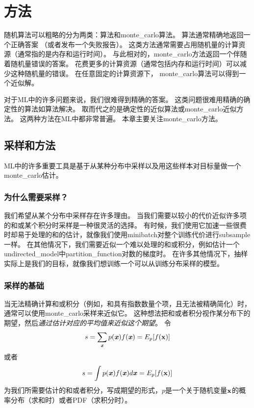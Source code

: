 \chapter{方法}
\label{chap:monte_carlo_methods}

随机算法可以粗略的分为两类：算法和\gls{monte_carlo}算法。
算法通常精确地返回一个正确答案 （或者发布一个失败报告）。
这类方法通常需要占用随机量的计算资源（通常指的是内存和运行时间）。
与此相对的，\gls{monte_carlo}方法返回一个伴随着随机量错误的答案。
花费更多的计算资源（通常包括内存和运行时间）可以减少这种随机量的错误。
在任意固定的计算资源下， \gls{monte_carlo}算法可以得到一个近似解。

对于\gls{ML}中的许多问题来说，我们很难得到精确的答案。
这类问题很难用精确的确定性的算法如算法解决。%
取而代之的是确定性的近似算法或\gls{monte_carlo}近似方法。
这两种方法在\gls{ML}中都非常普遍。
本章主要关注\gls{monte_carlo}方法。

\section{采样和方法}
\label{sec:sampling_and_monte_carlo_methods}

\gls{ML}中的许多重要工具是基于从某种分布中采样以及用这些样本对目标量做一个\gls{monte_carlo}估计。

\subsection{为什么需要采样？}
\label{sec:why_sampling}

我们希望从某个分布中采样存在许多理由。
当我们需要以较小的代价近似许多项的和或某个积分时采样是一种很灵活的选择。
有时候，我们使用它加速一些很费时却易于处理的和的估计，就像我们使用\gls{minibatch}对整个训练代价进行\gls{subsample}一样。
在其他情况下，我们需要近似一个难以处理的和或积分，例如估计一个\gls{undirected_model}中\gls{partition_function}对数的梯度时。
在许多其他情况下，抽样实际上是我们的目标，就像我们想训练一个可以从训练分布采样的模型。

\subsection{采样的基础}
\label{sec:basics_of_monte_carlo_sampling}

当无法精确计算和或积分（例如，和具有指数数量个项，且无法被精确简化）时，通常可以使用\gls{monte_carlo}采样来近似它。
这种想法把和或者积分视作某分布下的期望，然后\emph{通过估计对应的平均值来近似这个期望}。
令
\begin{align}
s = \sum_{\boldsymbol{\mathit{x}}} p(\boldsymbol{\mathit{x}})f(\boldsymbol{\mathit{x}}) = E_p[f(\mathbf{x})]
\end{align}
或者
\begin{align}
\label{eqn:integra}
s = \int p(\boldsymbol{\mathit{x}})f(\boldsymbol{\mathit{x}})d\boldsymbol{\mathit{x}} = E_p[f(\mathbf{x})]
\end{align}
为我们所需要估计的和或者积分，写成期望的形式，$p$是一个关于随机变量$\mathbf{x}$的概率分布（求和时）或者\gls{PDF}（求积分时）。

